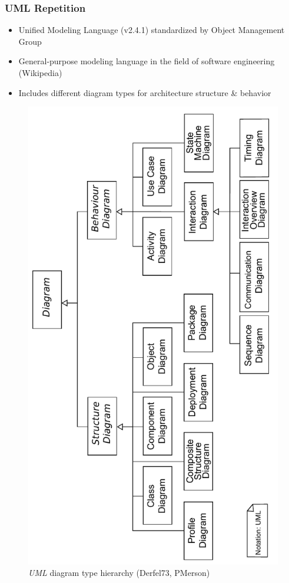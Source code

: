 \documentclass{beamer}
\begin{document}
\begin{frame}
 \frametitle{UML Repetition}
 \begin{itemize}
  \item Unified Modeling Language (v2.4.1) standardized by Object Management Group \cite{man:UML}
  \item General-purpose modeling language in the field of software engineering (Wikipedia)
  \item Includes different diagram types for architecture structure \& behavior
 \end{itemize}
\begin{figure}[h!t]
 \centering
 \includegraphics[scale=0.35,angle=270]{images/uml}
 \caption{\textit{UML} diagram type hierarchy (Derfel73, PMerson)}
 \label{fig:uml}
\end{figure}
\end{frame}
\end{document}
